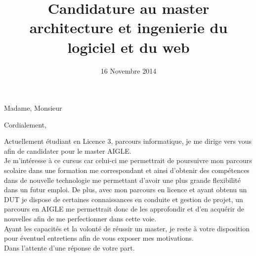 \documentclass[11pt,a4paper,sans]{moderncv}
\title{Candidature au master architecture et ingenierie du logiciel et du web}
\begin{document}
\date{16 Novembre 2014}
\opening{Madame, Monsieur}
\closing{Cordialement,}
\makelettertitle

Actuellement étudiant en Licence 3, parcours informatique, je me dirige vers vous afin de candidater pour le master AIGLE.\\ 

Je m'intéresse à ce cursus car celui-ci me permettrait de poursuivre mon parcours scolaire dans une formation me correspondant et ainsi d'obtenir des compétences dans de nouvelle technologie me permettant d'avoir une plus grande flexibilité dans un futur emploi. De plus, avec mon parcours en licence et ayant obtenu un DUT je dispose de certaines connaissances en conduite et gestion de projet, un parcours en AIGLE me permettrait donc de les approfondir et d'en acquérir de nouvelles afin de me perfectionner dans cette voie.\\

Ayant les capacités et la volonté de réussir un master,
je reste à votre disposition pour éventuel entretiens afin de vous exposer mes motivations.\\
Dans l'attente d'une réponse de votre part.\\

\makeletterclosing
\end{document}
